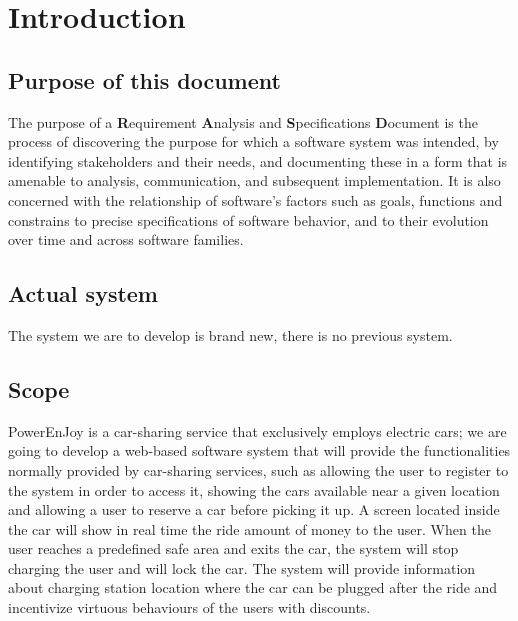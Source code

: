 \section{Introduction}
\subsection{Purpose of this document}
The purpose of a \textbf{R}equirement \textbf{A}nalysis and \textbf{S}pecifications \textbf{D}ocument is the process of discovering the purpose for which a software system was intended, by identifying stakeholders and their needs, and documenting these in a form that is amenable to analysis, communication, and subsequent implementation.  It is also concerned with the relationship of software's factors such as goals, functions and constrains to precise specifications of software behavior, and to their evolution over time and across software families.

\subsection{Actual system}
The system we are to develop is brand new, there is no previous system.

\subsection{Scope}
PowerEnJoy is a car-sharing service that exclusively employs electric cars; we are going to develop a web-based software system that will provide the functionalities normally provided by car-sharing services, such as allowing the user to register to the system in order to access it, showing the cars available near a given location and allowing a user to reserve a car before picking it up.
A screen located inside the car will show in real time the ride amount of money to the user. When the user reaches a predefined safe area and exits the car, the system will stop charging the user and will lock the car. The system will provide information about charging station location where the car can be plugged after the ride and incentivize virtuous behaviours of the users with discounts.
